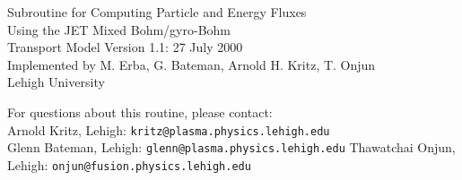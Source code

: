 \documentclass{article}    %
\begin{document}
\begin{center}
{\LARGE Subroutine for Computing Particle and Energy Fluxes\\ \vskip8pt
Using the JET Mixed Bohm/gyro-Bohm\\ \vskip8pt
Transport Model
}\vskip1.0cm
Version 1.1: 27 July 2000 \\
Implemented by M. Erba, G. Bateman, Arnold H. Kritz, T. Onjun\\
 Lehigh University
\end{center}
For questions about this routine, please contact: \\
Arnold Kritz, Lehigh: {\tt kritz@plasma.physics.lehigh.edu}\\
Glenn Bateman, Lehigh: {\tt glenn@plasma.physics.lehigh.edu}
Thawatchai Onjun, Lehigh: {\tt onjun@fusion.physics.lehigh.edu}\\ \vskip8pt
\end{document}
